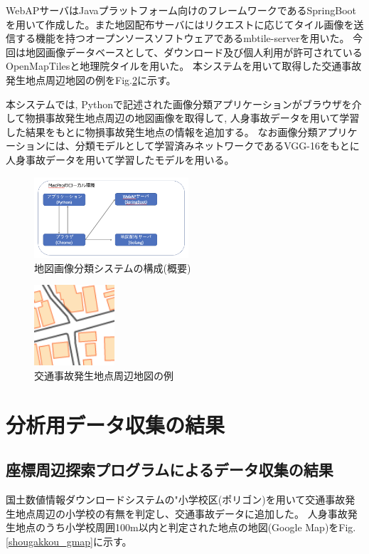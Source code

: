 \documentclass[a4j,8.5pt, twocolumn,fleqn]{jbook}
\begin{document}
WebAPサーバはJavaプラットフォーム向けのフレームワークであるSpringBootを用いて作成した。また地図配布サーバにはリクエストに応じてタイル画像を送信する機能を持つオープンソースソフトウェアであるmbtile-server\cite{mbtile-server}を用いた。
今回は地図画像データベースとして、ダウンロード及び個人利用が許可されているOpenMapTiles\cite{openmaptiles}と地理院タイル\cite{tiriixn_tile}を用いた。
本システムを用いて取得した交通事故発生地点周辺地図の例をFig.\ref{tiriixn}に示す。

本システムでは, Pythonで記述された画像分類アプリケーションがブラウザを介して物損事故発生地点周辺の地図画像を取得して, 人身事故データを用いて学習した結果をもとに物損事故発生地点の情報を追加する。
なお画像分類アプリケーションには、分類モデルとして学習済みネットワークであるVGG-16をもとに人身事故データを用いて学習したモデルを用いる。

\begin{figure}[htb]
    \centering
    \includegraphics[height=30mm]{images/mapclassification_server.png}
    \vspace{-3mm}
    \caption{地図画像分類システムの構成(概要)}
    \label{classifications}
\end{figure}

\begin{figure}[htb]
    \centering
    \includegraphics[height=30mm]{images/tiriixn.png}
    \vspace{-3mm}
    \caption{交通事故発生地点周辺地図の例}
    \label{tiriixn}
\end{figure}


\section{分析用データ収集の結果}
\subsection{座標周辺探索プログラムによるデータ収集の結果}
国土数値情報ダウンロードシステムの"小学校区(ポリゴン)を用いて交通事故発生地点周辺の小学校の有無を判定し、交通事故データに追加した。
人身事故発生地点のうち小学校周囲100m以内と判定された地点の地図(Google Map)をFig.\ref{shougakkou_gmap}に示す。
\end{document}
